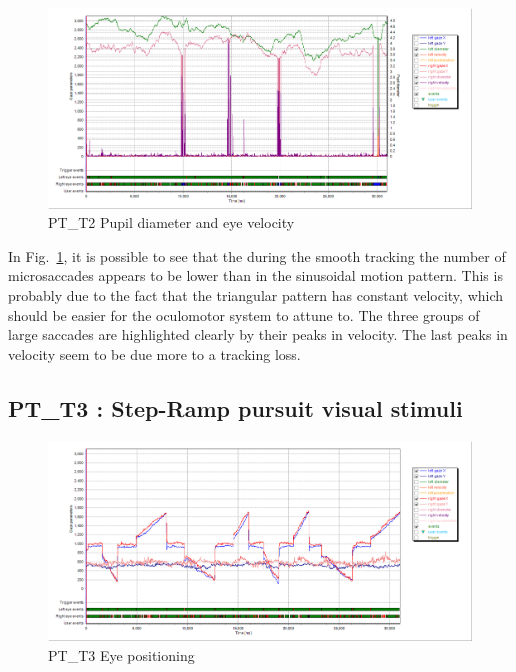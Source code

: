 \begin{figure}[h]
  \centering
  \includegraphics[width=.8\textwidth]{figures/graphs/PT_T2(triangular)_VP.png}
  \caption[PT\_T2 Eye Pupil size and velocity profile]{PT\_T2 Pupil diameter and eye velocity}
  \label{fig:PT_T2_vel}
\end{figure}

In Fig.~\ref{fig:PT_T2_vel}, it is possible to see that the during the smooth tracking the number of microsaccades appears to be lower than in the sinusoidal motion pattern. This is probably due to the fact that the triangular pattern has constant velocity, which should be easier for the oculomotor system to attune to. The three groups of large saccades are highlighted clearly by their peaks in velocity. The last peaks in velocity seem to be due more to a tracking loss.



\subsection{PT\_T3 : Step-Ramp pursuit visual stimuli}
\label{sec:PT_T3}

\begin{figure}[t]
  \centering
  \includegraphics[width=.8\textwidth]{figures/graphs/PT_T3(stepRamp)_XY.png}
  \caption[PT\_T3 Eye positioning]{PT\_T3 Eye positioning}
  \label{fig:PT_T3_pos}
\end{figure}

